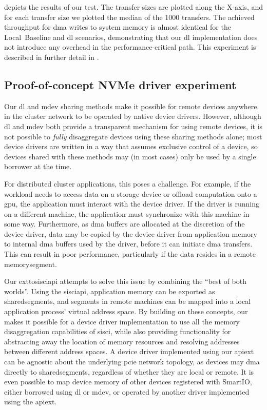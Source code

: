  depicts the results of our test.
%
The transfer sizes are plotted along the X-axis, and for each transfer size we plotted the median of the 1000 transfers.
%
The achieved throughput for \gls{dma} writes to system memory is almost identical for the Local~Baseline and \gls{dl} scenarios, demonstrating that our \gls{dl} implementation does not introduce any overhead in the performance-critical path.
%
This experiment is described in further detail in .



\subsection{Proof-of-concept NVMe driver experiment}\label{sec:eval-nvme}
Our \gls{dl} and \gls{mdev} sharing methods make it possible for remote devices anywhere in the cluster network to be operated by native device drivers.
%
However, although \gls{dl} and \gls{mdev} both provide a transparent mechanism for using remote devices, it is not possible to \emph{fully} \gls{disaggregate} devices using these sharing methods alone;
%
most device drivers are written in a way that assumes exclusive control of a device, so devices shared with these methods may (in most cases) only be used by a single \gls{borrower} at the time.



For distributed cluster applications, this poses a challenge.
%
For example, if the workload needs to access data on a storage device or offload computation onto a \gls{gpu}, the application must interact with the device driver.
%
If the driver is running on a different machine, the application must synchronize with this machine in some way.
%
Furthermore, as \gls{dma} buffers are allocated at the discretion of the device driver, data may be copied by the device driver from application memory to internal \gls{dma} buffers used by the driver, before it can initiate \gls{dma} transfers.
%
This can result in poor performance, particularly if the data resides in a remote \gls{memorysegment}.




Our \gls{exttosisciapi} attempts to solve this issue by combining the ``best of both worlds''.
%
Using the \gls{sisciapi}, application memory can be exported as \glspl{sharedsegment}, and \glspl{segment} in remote machines can be mapped into a local application process' virtual address space.
%
By building on these concepts, our  makes it possible for a device driver implementation to use all the memory \gls{disaggregation} capabilities of \gls{sisci}, while also providing functionality for abstracting away the location of memory resources and resolving addresses between different address spaces.
%
A device driver implemented using our \gls{apiext} can be agnostic about the underlying \gls{pcie} network topology, as devices may \gls{dma} directly to \glspl{sharedsegment}, regardless of whether they are local or remote.
%
It is even possible to map device memory of other devices registered with SmartIO, either borrowed using \gls{dl} or \gls{mdev}, or operated by another driver implemented using the \gls{apiext}.



